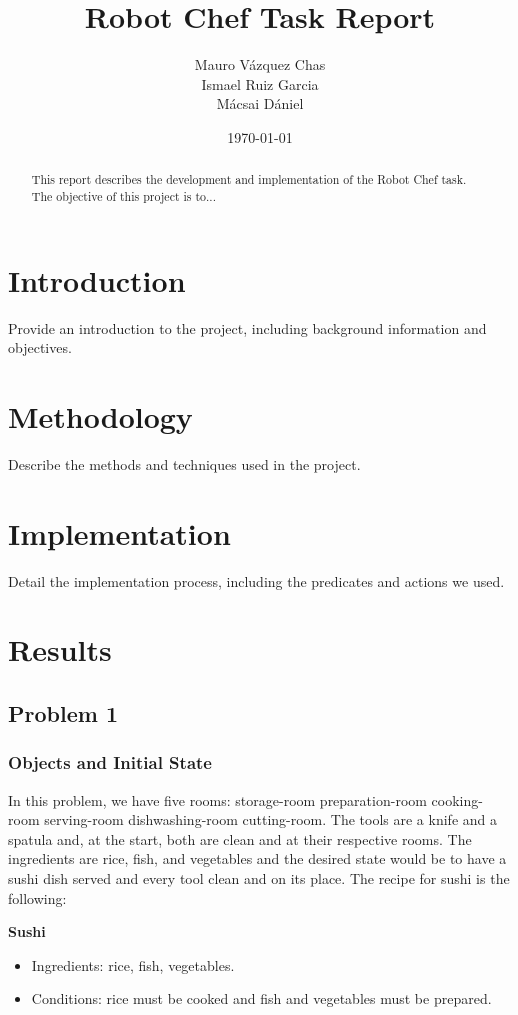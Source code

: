 \documentclass[a4paper,12pt]{article}
\title{Robot Chef Task Report}
\author{Mauro Vázquez Chas \\
Ismael Ruiz Garcia \\
Mácsai Dániel
}
\date{\today}
\begin{document}
\maketitle

\begin{abstract}
This report describes the development and implementation of the Robot Chef task. The objective of this project is to...
\end{abstract}

\tableofcontents

\section{Introduction}
\label{sec:introduction}
Provide an introduction to the project, including background information and objectives.

\section{Methodology}
\label{sec:methodology}
Describe the methods and techniques used in the project.

\section{Implementation}
\label{sec:implementation}
Detail the implementation process, including the predicates and actions we used. 

\section{Results}
\subsection{Problem 1}
\subsubsection{Objects and Initial State}
In this problem, we have five rooms: storage-room preparation-room cooking-room serving-room dishwashing-room cutting-room. The tools are a knife and a spatula and, at the start, both are clean and at their respective rooms. The ingredients are rice, fish, and vegetables and the desired state would be to have a sushi dish served and every tool clean and on its place. The recipe for sushi is the following:

\textbf{Sushi}
\begin{itemize}
    \item Ingredients: rice, fish, vegetables.
    \item Conditions: rice must be cooked and fish and vegetables must be prepared.
\end{itemize}
\end{document}
